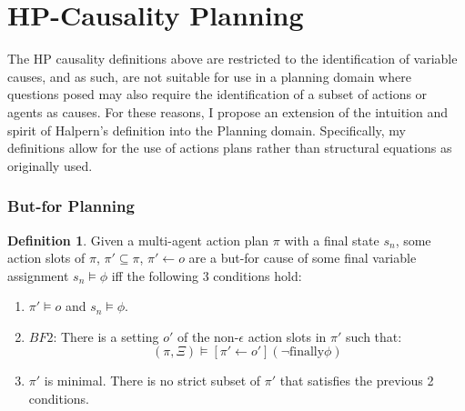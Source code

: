 \documentclass{article}
\theoremstyle{plain}
\theoremstyle{definition}
\newtheorem{defn}[thm]{Definition} %
\begin{document}
\newpage

\section{HP-Causality Planning} \label{sec:hpCausalityPlanning}
The HP causality definitions above are restricted to the identification of variable causes, and as such, are not suitable for use in a planning domain where questions posed may also require the identification of a subset of actions or agents as causes. For these reasons, I propose an extension of the intuition and spirit of Halpern's definition into the Planning domain. Specifically, my definitions allow for the use of actions plans rather than structural equations as originally used.

\subsubsection*{But-for Planning} \label{sec:butForPlanning}
\begin{defn} 

Given a multi-agent action plan $\pi$ with a final state $s_n$, some action slots of $\pi$, $\pi' \subseteq \pi$, $\pi' \leftarrow o$ are a but-for cause of some final variable assignment $s_n \models \phi$ iff the following 3 conditions hold:
\begin{enumerate}
\item $\pi' \models o$ and $s_n \models \phi$.
\item $BF2$: There is a setting $o'$ of the non-$\epsilon$ action slots in $\pi'$ such that:
\[
(\pi, \Xi) \models [\pi' \leftarrow o'](\lnot \textrm{finally} \phi)
\]
\item $\pi'$ is minimal. There is no strict subset of $\pi'$ that satisfies the previous 2 conditions.
\end{enumerate}


\end{defn}
\end{document}
